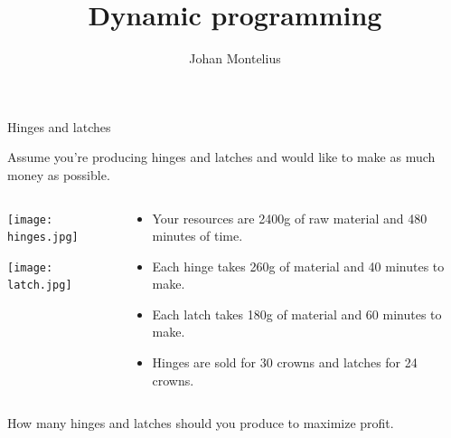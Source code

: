 

\title[ID1019 Dynamic programming]{Dynamic programming}


\author{Johan Montelius}
\date{\semester}



\begin{frame}
\titlepage
\end{frame}

\begin{frame}{Hinges and latches}

\pause Assume you're producing hinges and latches and would like to make as much money as possible.

\begin{columns}

 \begin{column}{0.4\linewidth}

\texttt{[image: hinges.jpg]}

\texttt{[image: latch.jpg]}

 \end{column}
 \begin{column}{0.5\linewidth}
  \begin{itemize}
\pause\item Your resources are 2400g of raw material and 480 minutes of time.

\pause\item Each hinge takes 260g of material and 40 minutes to make.

\pause \item Each latch takes 180g of material and 60 minutes to make.

\pause \item Hinges are sold for 30 crowns and latches for 24 crowns.
  \end{itemize}
 \end{column}
\end{columns}
\pause \vspace{20pt}

How many hinges and latches should you produce to maximize profit.

\end{frame}


